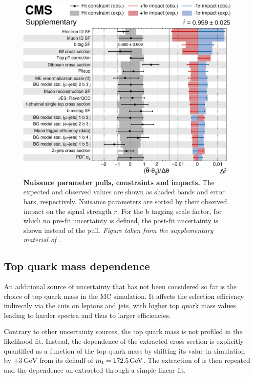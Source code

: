 \begin{figure}[!ht]
    \centering
    \includegraphics[width=0.9\linewidth]{figures/ttxs/impacts_v2.pdf}
    \caption{\textbf{Nuisance parameter pulls, constraints and impacts.} The expected and observed values are shown as shaded bands and error bars, respectively. Nuisance parameters are sorted by their observed impact on the signal strength $r$. For the b tagging scale factor, for which no pre-fit uncertainty is defined, the post-fit uncertainty is shown instead of the pull. \textit{Figure taken from the supplementary material of }.}
    \label{fig:ttxs:impacts}
\end{figure}



\subsection{Top quark mass dependence}
\label{sec:ttxs:topmass}

An additional source of uncertainty that has not been considered so far is the choice of top quark mass in the \ttbar MC simulation. It affects the selection efficiency indirectly via the \pt cuts on leptons and jets, with higher top quark mass values leading to harder spectra and thus to larger efficiencies.

Contrary to other uncertainty sources, the top quark mass is not profiled in the likelihood fit. Instead, the dependence of the extracted \ttbar cross section is explicitly quantified as a function of the top quark mass by shifting its value in simulation by $\pm \SI{3}{\GeV}$ from its defaulf of $\mt = \SI{172.5}{\GeV}$.
The extraction of \sigmatt is then repeated and the dependence on \mt extracted through a simple linear fit.

